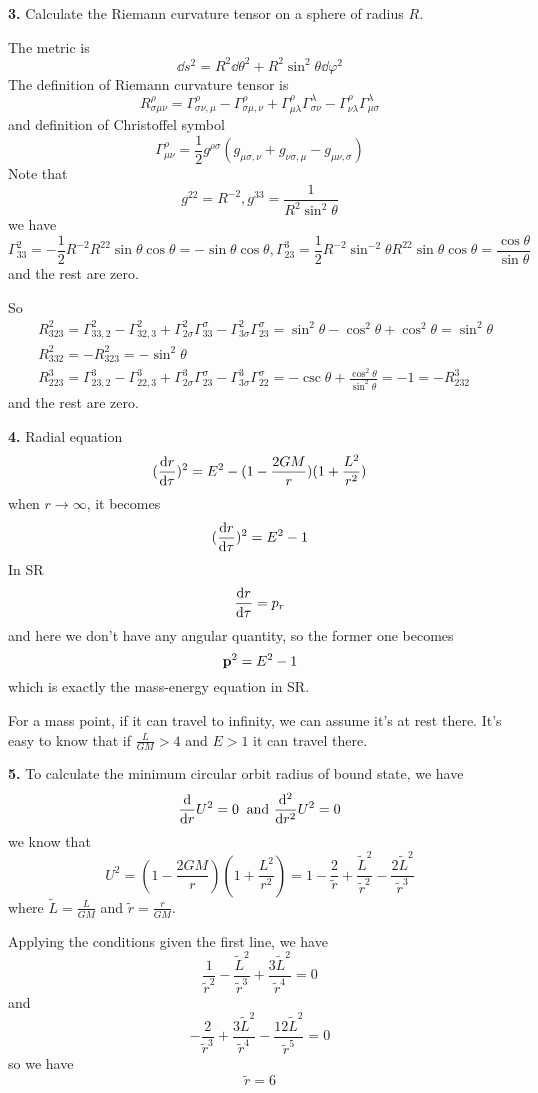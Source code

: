 \documentclass{article}
\newcommand{\la}{\lambda}
\newcommand{\s}{\sigma}
\renewcommand{\G}{\Gamma}
\renewcommand{\tr}{\tilde r}
\newcommand{\tL}{\tilde L}
\begin{document}
{\bf3.}\quad
Calculate the Riemann curvature tensor on a sphere of radius $R$.

The metric is
$$\dd s^2=%
R^2\dd\theta^2+R^2\sin^2\theta\dd\varphi^2$$
The definition of Riemann curvature tensor is
$$R^{\rho}_{\s\mu\nu}=\G^{\rho}_{\s\nu,\mu}-\G^{\rho}_{\s\mu,\nu}+\G^{\rho}_{\mu\la}\G^{\la}_{\s\nu}-\G^{\rho}_{\nu\la}\G^{\la}_{\mu\s}$$
and definition of Christoffel symbol
$$\G^{\rho}_{\mu\nu}=\frac{1}{2}g^{\rho\s}(g_{\mu\s,\nu}+g_{\nu\s,\mu}-g_{\mu\nu,\s})$$
Note that
$$%
g^{22}=R^{-2},g^{33}=\frac{1}{R^2\sin^2{\theta}}$$
we have
$$\G^{2}_{33}=-\frac{1}{2}R^{-2}R^22\sin\theta\cos\theta=-\sin\theta\cos\theta,\G^{3}_{23}=\frac{1}{2}R^{-2}\sin^{-2}\theta R^22\sin\theta\cos\theta=\frac{\cos\theta}{\sin\theta}$$
and the rest are zero.

So
\begin{align*}
  &R^{2}_{323}=\G^{2}_{33,2}-\G^{2}_{32,3}+\G^{2}_{2\s}\G^{\s}_{33}-\G^{2}_{3\s}\G^{\s}_{23}=\sin^2\theta-\cos^2\theta+\cos^2\theta=\sin^2\theta\\
  &R^{2}_{332}=-R^{2}_{323}=-\sin^2\theta\\
  &R^{3}_{223}=\G^{3}_{23,2}-\G^{3}_{22,3}+\G^{3}_{2\s}\G^{\s}_{23}-\G^{3}_{3\s}\G^{\s}_{22}=-\csc\theta+\frac{\cos^2\theta}{\sin^2\theta}=-1=-R^{3}_{232}
\end{align*}
and the rest are zero.

{\bf4.}\quad
Radial equation
$$(\dv{ r}{\tau})^2=E^2-(1-\frac{2GM}{r})(1+\frac{L^2}{r^2})$$
when $r\rightarrow\infty$, it becomes
$$(\dv{ r}{\tau})^2=E^2-1$$
In SR
$$\dv{r}{\tau}=p_r$$
and here we don't have any angular quantity, so the former one becomes
$$\vb{p}^2=E^2-1$$
which is exactly the mass-energy equation in SR.

For a mass point, if it can travel to infinity, we can assume it's at rest there. It's easy to know that if $\frac{L}{GM}>4$ and $E>1$ it can travel there.

{\bf5.}\quad
To calculate the minimum circular orbit radius of bound state, we have
$$\dv{r}U^2=0\;\;\text{and }\dv[2]{r}U^2=0$$
we know that
$$U^2=(1-\frac{2GM}{r})(1+\frac{L^2}{r^2})=1-\frac{2}{\tilde r}+\frac{\tL^2}{\tr^2}-\frac{2\tL^2}{\tr^3}$$
where $\tL=\frac{L}{GM}$ and $\tr=\frac{r}{GM}$.

Applying the conditions given the first line, we have
$$\frac{1}{\tr^2}-\frac{\tL^2}{\tr^3}+\frac{3\tL^2}{\tr^4}=0$$
and
$$-\frac{2}{\tr^3}+\frac{3\tL^2}{\tr^4}-\frac{12\tL^2}{\tr^5}=0$$
so we have
$$\tr=6$$
\end{document}
